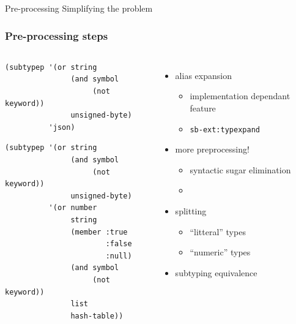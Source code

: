 \documentclass[aspectratio=169]{beamer}
\renewcommand\code[1]{\texttt{#1}}
\begin{document}
\begin{sectionframe}{Pre-processing}
  Simplifying the problem
\end{sectionframe}

\begin{frame}[fragile]
  \frametitle{Pre-processing steps}
  \begin{columns}
  \begin{mintedcodebox}[title=\code{name}'s type verification,icon=\(\lambda\),compact]
    \begin{overprint}
\begin{verbatim}
(subtypep '(or string
               (and symbol
                    (not keyword))
               unsigned-byte)
          'json)
\end{verbatim}

\begin{verbatim}
(subtypep '(or string
               (and symbol
                    (not keyword))
               unsigned-byte)
          '(or number
               string
               (member :true
                       :false
                       :null)
               (and symbol
                    (not keyword))
               list
               hash-table))
\end{verbatim}
    \end{overprint}
  \end{mintedcodebox}

    \begin{itemize}
    \item<2-> alias expansion
      \begin{itemize}
      \item implementation dependant feature
      \item \code{sb-ext:typexpand}
      \end{itemize}
    \item<3-> more preprocessing!
      \begin{itemize}
      \item syntactic sugar elimination
      \item {}
      \end{itemize}
    \item<5-> splitting
      \begin{itemize}
      \item ``litteral'' types
      \item ``numeric'' types
      \end{itemize}
    \item<6-> subtyping equivalence
    \end{itemize}
  \end{columns}
\end{frame}
\end{document}

